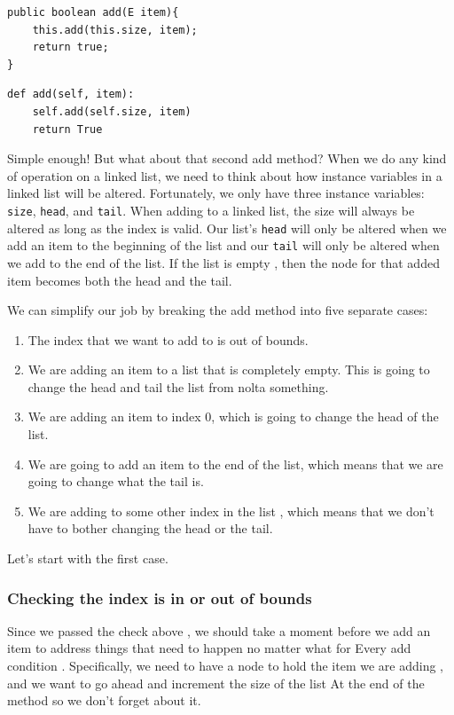 \documentclass[10pt,a4paper]{book}
\begin{document}
\begin{verbatim}
public boolean add(E item){
	this.add(this.size, item);
	return true;
}
\end{verbatim}

\begin{verbatim}
def add(self, item):
	self.add(self.size, item)
	return True
\end{verbatim}

Simple enough!  But what about that second add method?
When we do any kind of operation on a linked list, we need to think about how instance variables in a linked list will be altered. 
Fortunately, we only have three instance variables: \texttt{size}, \texttt{head}, and \texttt{tail}.
When adding to a linked list, the size will always be altered as long as the index is valid.
Our list's \texttt{head} will only be altered when we add an item to the beginning of the list and our \texttt{tail} will only be altered when we add to the end of the list.  If the list is empty , then the node for that added item becomes both the head and the tail.



We can simplify our job by breaking the add method into five separate cases:
\begin{enumerate}
	\item The index that we want to add to is out of bounds.
	\item We are adding an item to a list that is completely empty. This is going to change the head and tail the list from nolta something. 
	\item We are adding an item to index 0, which is going to change the head of the list.
	\item We are going to add an item to the end of the list, which means that we are going to change what the tail is.
	\item We are adding to some other index in the list , which means that we don't have to bother changing the head or the tail.
\end{enumerate}


Let's start with the first case.

\subsubsection{Checking the index is in or out of bounds}




Since we passed the check above , we should take a moment before we add an item to address things that need to happen no matter what for Every add condition . Specifically, we need to have a node to hold the item we are adding , and we want to go ahead and increment the size of the list At the end of the method so we don't forget about it.
 
\end{document}
